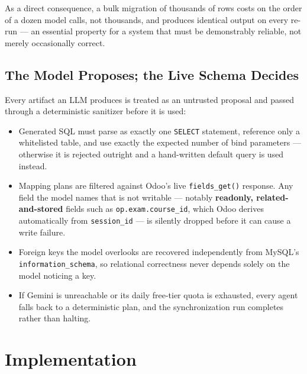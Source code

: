 \documentclass[11pt,a4paper]{article}
\begin{document}
As a direct consequence, a bulk migration of thousands of rows costs on the order of a dozen model calls, not thousands, and produces identical output on every re-run --- an essential property for a system that must be demonstrably reliable, not merely occasionally correct.

\subsection{The Model Proposes; the Live Schema Decides}
Every artifact an LLM produces is treated as an untrusted proposal and passed through a deterministic sanitizer before it is used:

\begin{itemize}
  \item Generated SQL must parse as exactly one \texttt{SELECT} statement, reference only a whitelisted table, and use exactly the expected number of bind parameters --- otherwise it is rejected outright and a hand-written default query is used instead.
  \item Mapping plans are filtered against Odoo's live \texttt{fields\_get()} response. Any field the model names that is not writable --- notably \textbf{readonly, related-and-stored} fields such as \texttt{op.exam.course\_id}, which Odoo derives automatically from \texttt{session\_id} --- is silently dropped before it can cause a write failure.
  \item Foreign keys the model overlooks are recovered independently from MySQL's \texttt{information\_schema}, so relational correctness never depends solely on the model noticing a key.
  \item If Gemini is unreachable or its daily free-tier quota is exhausted, every agent falls back to a deterministic plan, and the synchronization run completes rather than halting.
\end{itemize}

\newpage
\section{Implementation}
\end{document}
